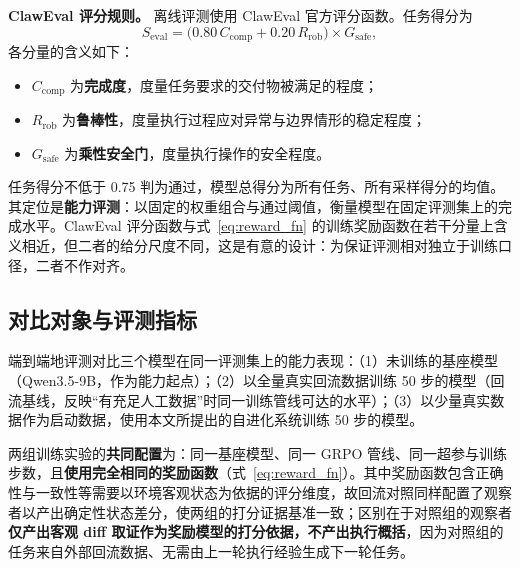 \textbf{ClawEval 评分规则。} 离线评测使用 ClawEval 官方评分函数。任务得分为
\begin{equation}
S_{\text{eval}} = \big(0.80\,C_{\text{comp}} + 0.20\,R_{\text{rob}}\big) \times G_{\text{safe}},
\label{eq:claweval_fn}
\end{equation}
各分量的含义如下：
\begin{itemize}
    \item $C_{\text{comp}}$ 为\textbf{完成度}，度量任务要求的交付物被满足的程度；
    \item $R_{\text{rob}}$ 为\textbf{鲁棒性}，度量执行过程应对异常与边界情形的稳定程度；
    \item $G_{\text{safe}}$ 为\textbf{乘性安全门}，度量执行操作的安全程度。
\end{itemize}
任务得分不低于 0.75 判为通过，模型总得分为所有任务、所有采样得分的均值。其定位是\textbf{能力评测}：以固定的权重组合与通过阈值，衡量模型在固定评测集上的完成水平。ClawEval 评分函数与式~\ref{eq:reward_fn} 的训练奖励函数在若干分量上含义相近，但二者的给分尺度不同，这是有意的设计：为保证评测相对独立于训练口径，二者不作对齐。

\subsection{对比对象与评测指标}

端到端地评测对比三个模型在同一评测集上的能力表现：（1）未训练的基座模型（Qwen3.5-9B，作为能力起点）；（2）以全量真实回流数据训练 50 步的模型（回流基线，反映“有充足人工数据”时同一训练管线可达的水平）；（3）以少量真实数据作为启动数据，使用本文所提出的自进化系统训练 50 步的模型。

两组训练实验的\textbf{共同配置}为：同一基座模型、同一 GRPO 管线、同一超参与训练步数，且\textbf{使用完全相同的奖励函数}（式~\eqref{eq:reward_fn}）。其中奖励函数包含正确性与一致性等需要以环境客观状态为依据的评分维度，故回流对照同样配置了观察者以产出确定性状态差分，使两组的打分证据基准一致；区别在于对照组的观察者\textbf{仅产出客观 diff 取证作为奖励模型的打分依据，不产出执行概括}，因为对照组的任务来自外部回流数据、无需由上一轮执行经验生成下一轮任务。

